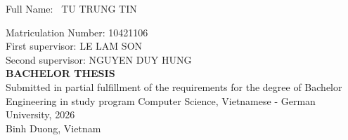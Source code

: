 \begin{center}
\begin{minipage}{\textwidth}
    \end{minipage}
    \makeatother
    \par\vspace{1.5cm}

    \fontsize{16pt}{24pt}\selectfont Full Name:
    \makeatletter\ TU TRUNG TIN \makeatother\\
    
    \par\vspace{2cm}

    Matriculation Number: 10421106 \\
    First supervisor: LE LAM SON \\
    Second supervisor: NGUYEN DUY HUNG \\ [1cm]

    \vspace{1.5cm}
    \fontsize{16pt}{16pt}\selectfont\textbf{BACHELOR THESIS} \\ [0.5cm]
    
    \fontsize{13pt}{13pt}\selectfont Submitted in partial fulfillment of the requirements for the degree of Bachelor Engineering in study program Computer Science, Vietnamese - German University, 2026 \\ [1cm]
    
    Binh Duong, Vietnam
\end{center}
